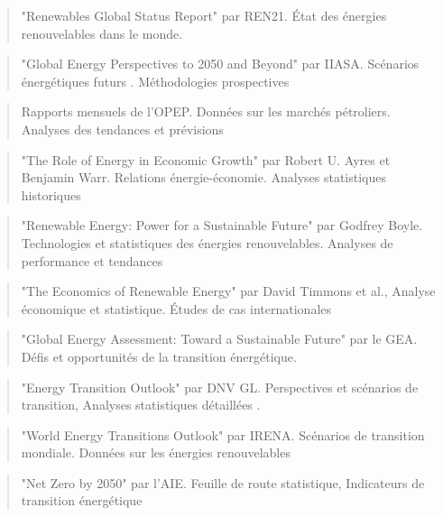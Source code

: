 \documentclass[a4paper,11pt]{report}
\begin{document}
\begin{quote}
"Renewables Global Status Report" par REN21. État des énergies renouvelables dans le monde.
\end{quote}

\begin{quote}
"Global Energy Perspectives to 2050 and Beyond" par IIASA. Scénarios énergétiques futurs . Méthodologies prospectives
\end{quote}

\begin{quote}
Rapports mensuels de l'OPEP. Données sur les marchés pétroliers. Analyses des tendances et prévisions
\end{quote}

\begin{quote}
"The Role of Energy in Economic Growth" par Robert U. Ayres et Benjamin Warr. Relations énergie-économie. Analyses statistiques historiques
\end{quote}

\begin{quote}
"Renewable Energy: Power for a Sustainable Future" par Godfrey Boyle. Technologies et statistiques des énergies renouvelables. Analyses de performance et tendances
\end{quote}

\begin{quote}
"The Economics of Renewable Energy" par David Timmons et al., Analyse économique et statistique. Études de cas internationales
\end{quote}

\begin{quote}
"Global Energy Assessment: Toward a Sustainable Future" par le GEA. Défis et opportunités de la transition énergétique.
\end{quote}

\begin{quote}
"Energy Transition Outlook" par DNV GL. Perspectives et scénarios de transition, Analyses statistiques détaillées .
\end{quote}

\begin{quote}
"World Energy Transitions Outlook" par IRENA. Scénarios de transition mondiale. Données sur les énergies renouvelables
\end{quote}

\begin{quote}
"Net Zero by 2050" par l'AIE. Feuille de route statistique, Indicateurs de transition énergétique
\end{quote}
\end{document}
